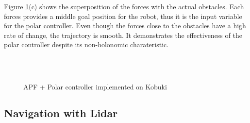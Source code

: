 \documentclass[conference]{IEEEtran}
\begin{document}
Figure \ref{f:kbki}(c) shows the superposition of the forces with the actual obstacles. Each forces provides a middle goal position for the robot, thus it is the input variable for the polar controller. Even though the forces close to the obstacles have a high rate of change, the trajectory is smooth. It demonstrates the effectiveness of the polar controller despite its non-holonomic charateristic. 
\begin{figure}
	\centering
	\\
	\\
	\caption{APF + Polar controller implemented on Kobuki} \label{f:kbki}
\end{figure}

\subsection{Navigation with Lidar}
\end{document}
